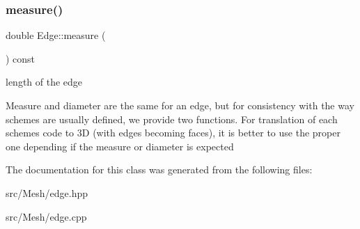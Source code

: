 \subsubsection{\texorpdfstring{measure()}{measure()}}
{\footnotesize\ttfamily double Edge\+::measure (\begin{DoxyParamCaption}{ }\end{DoxyParamCaption}) const}



length of the edge 

Measure and diameter are the same for an edge, but for consistency with the way schemes are usually defined, we provide two functions. For translation of each scheme\textquotesingle{}s code to 3D (with edges becoming faces), it is better to use the proper one depending if the measure or diameter is expected 

The documentation for this class was generated from the following files\+:\begin{DoxyCompactItemize}
\item 
src/\+Mesh/edge.\+hpp\item 
src/\+Mesh/edge.\+cpp\end{DoxyCompactItemize}
